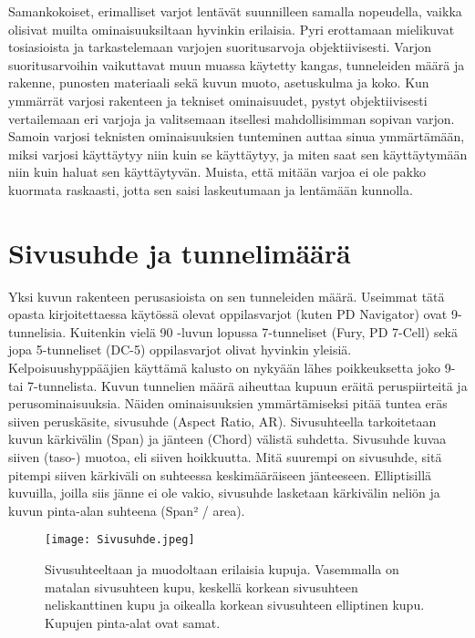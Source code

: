 
Samankokoiset, erimalliset varjot lentävät suunnilleen samalla nopeudella, vaikka olisivat muilta ominaisuuksiltaan hyvinkin erilaisia. Pyri erottamaan mielikuvat tosiasioista ja tarkastelemaan varjojen suoritusarvoja objektiivisesti. Varjon suoritusarvoihin vaikuttavat muun muassa käytetty kangas, tunneleiden määrä ja rakenne, punosten materiaali sekä kuvun muoto, asetuskulma ja koko. Kun ymmärrät varjosi rakenteen ja tekniset ominaisuudet, pystyt objektiivisesti vertailemaan eri varjoja ja valitsemaan itsellesi mahdollisimman sopivan varjon. Samoin varjosi teknisten ominaisuuksien tunteminen auttaa sinua ymmärtämään, miksi varjosi käyttäytyy niin kuin se käyttäytyy, ja miten saat sen käyttäytymään niin kuin haluat sen käyttäytyvän. Muista, että mitään varjoa ei ole pakko kuormata raskaasti, jotta sen saisi laskeutumaan ja lentämään kunnolla. 

\section{ Sivusuhde ja tunnelimäärä }
\label{varjon-ominaisuudet-sivusuhde-ja-tunnelimaara}


Yksi kuvun rakenteen perusasioista on sen tunneleiden määrä. Useimmat tätä opasta kirjoitettaessa käytössä olevat oppilasvarjot (kuten PD Navigator) ovat 9-tunnelisia. Kuitenkin vielä 90 -luvun lopussa 7-tunneliset (Fury, PD 7-Cell) sekä jopa 5-tunneliset (DC-5) oppilasvarjot olivat hyvinkin yleisiä. Kelpoisuushyppääjien käyttämä kalusto on nykyään lähes poikkeuksetta joko 9- tai 7-tunnelista. Kuvun tunnelien määrä aiheuttaa kupuun eräitä peruspiirteitä ja perusominaisuuksia. Näiden ominaisuuksien ymmärtämiseksi pitää tuntea eräs siiven peruskäsite, sivusuhde (Aspect Ratio, AR). Sivusuhteella tarkoitetaan kuvun kärkivälin (Span) ja jänteen (Chord) välistä suhdetta. Sivusuhde kuvaa siiven (taso-) muotoa, eli siiven hoikkuutta. Mitä suurempi on sivusuhde, sitä pitempi siiven kärkiväli on suhteessa keskimääräiseen jänteeseen. Elliptisillä kuvuilla, joilla siis jänne ei ole vakio, sivusuhde lasketaan kärkivälin neliön ja kuvun pinta-alan suhteena (Span² / area). 


\begin{figure*}[]\centering\texttt{[image: Sivusuhde.jpeg]}\caption{Sivusuhteeltaan ja muodoltaan erilaisia kupuja. Vasemmalla on matalan sivusuhteen kupu, keskellä korkean sivusuhteen neliskanttinen kupu ja oikealla korkean sivusuhteen elliptinen kupu. Kupujen pinta-alat ovat samat.}\end{figure*} 



